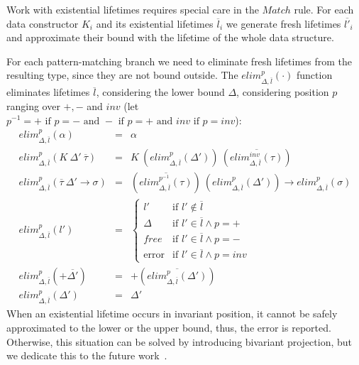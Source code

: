 \documentclass[11pt]{article}
\newcommand{\ap}{~}
\begin{document}
    Work with existential lifetimes requires special care in the $Match$ rule.
    For each data constructor $K_i$ and its existential lifetimes $\overline{l}_i$ we generate fresh lifetimes $\overline{l'}_i$ and approximate their bound with the lifetime of the whole data structure.

    For each pattern-matching branch we need to eliminate fresh lifetimes from the resulting type, since they are not bound outside. %
    The $elim_{\Delta, \overline{l}}^p(\cdot)$ function eliminates lifetimes $\overline{l}$, considering the lower bound $\Delta$, considering position $p$ ranging over $+, -$ and $inv$ (let $p^{-1} = + \text{ if } p = - \text{ and } - \text{ if } p = + \text{ and } inv \text{ if } p = inv$):
    \[
        \begin{array}{lll}
            elim_{\Delta, \overline{l}}^p(\alpha) & = & \alpha \\
            elim_{\Delta, \overline{l}}^p(K\ap \Delta'\ap\overline{\tau}) & = & K\ap \left( elim_{\Delta, \overline{l}}^p(\Delta') \right)\ap\left( \overline{elim_{\Delta, \overline{l}}^{inv}(\tau)} \right) \\
            elim_{\Delta, \overline{l}}^p(\overline{\tau}~\Delta'\to\sigma) & = & \left( \overline{elim_{\Delta, \overline{l}}^{p^{-1}}(\tau)} \right)~\left( elim_{\Delta, \overline{l}}^p(\Delta') \right)\to elim_{\Delta, \overline{l}}^{p}(\sigma) \\
            elim_{\Delta, \overline{l}}^{p}(l') & = &
            \begin{cases}
                l'     & \text{if } l' \not\in\overline{l} \\
                \Delta & \text{if } l' \in \overline{l} \land p = + \\
                free   & \text{if } l' \in \overline{l} \land p = - \\
                \text{error}  & \text{if } l' \in \overline{l} \land p = inv
            \end{cases} \\
            elim_{\Delta, \overline{l}}^{p}(+\overline{\Delta'}) & = & +\left( \overline{elim_{\Delta, \overline{l}}^{p}(\Delta')} \right) \\
            elim_{\Delta, \overline{l}}^{p}(\Delta') & = & \Delta'
        \end{array}
    \]
    When an existential lifetime occurs in invariant position, it cannot be safely approximated to the lower or the upper bound, thus, the error is reported.
    Otherwise, this situation can be solved by introducing bivariant projection, but we dedicate this to the future work~\cite{tate2013mixed}.
\end{document}
